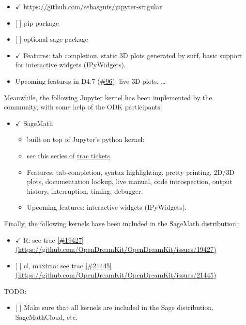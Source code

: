 \begin{itemize}
  \begin{itemize}
  \tightlist
  \item
    \(\checkmark\) \url{https://github.com/sebasguts/jupyter-singular}
  \item
    {[} {]} pip package
  \item
    {[} {]} optional sage package
  \item
    \(\checkmark\) Features: tab completion, static 3D plots generated
    by surf, basic support for interactive widgets (IPyWidgets).
  \item
    Upcoming features in D4.7
    (\href{https://github.com/OpenDreamKit/OpenDreamKit/issues/96}{\#96}):
    live 3D plots, \ldots{}
  \end{itemize}
\end{itemize}

Meanwhile, the following Jupyter kernel has been implemented by the
community, with some help of the ODK participants:

\begin{itemize}
\tightlist
\item
  \(\checkmark\) SageMath

  \begin{itemize}
  \tightlist
  \item
    built on top of Jupyter's python kernel:
  \item
    see this series of
    \href{https://trac.sagemath.org/query?status=closed\&summary=~Jupyter\&col=id\&col=summary\&col=status\&col=type\&col=priority\&col=milestone\&col=component\&order=priority}{trac
    tickets}
  \item
    Features: tab-completion, syntax highlighting, pretty printing,
    2D/3D plots, documentation lookup, live manual, code introspection,
    output history, interruption, timing, debugger.
  \item
    Upcoming features: interactive widgets (IPyWidgets).
  \end{itemize}
\end{itemize}

Finally, the following kernels have been included in the SageMath
distribution:

\begin{itemize}
\tightlist
\item
  \(\checkmark\) R: see trac
  \href{https://trac.sagemath.org/ticket/19427}{{[}\#19427{]}(https://github.com/OpenDreamKit/OpenDreamKit/issues/19427)}
\item
  {[} {]} cl, maxima: see trac
  \href{https://trac.sagemath.org/ticket/21445}{{[}\#21445{]}(https://github.com/OpenDreamKit/OpenDreamKit/issues/21445)}
\end{itemize}

TODO:

\begin{itemize}
\tightlist
\item
  {[} {]} Make sure that all kernels are included in the Sage
  distribution, SageMathCloud, etc.
\end{itemize}
